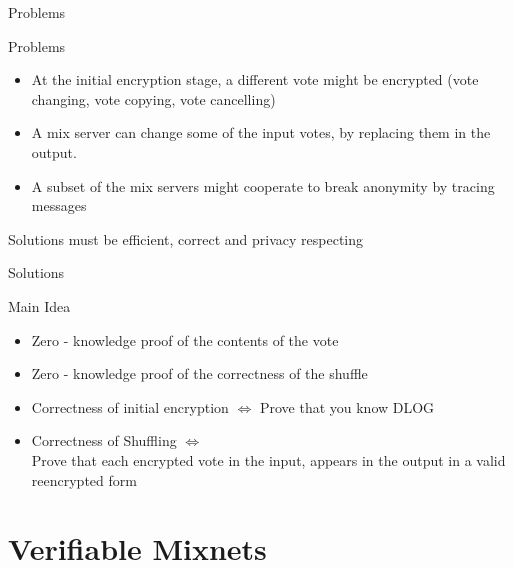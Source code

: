 \documentclass{beamer}
\newcommand*{\addsp}{\usebeamertemplate*{section page1}}
\begin{document}
\begin{frame}{Problems}
\begin{block}{Problems}
\begin{itemize}
\item At the initial encryption stage, a different vote might be encrypted (vote changing, vote copying, vote cancelling)
\item A mix server can change some of the input votes, by replacing them in the output.
\item A subset of the mix servers might cooperate to break anonymity by tracing messages
\end{itemize}
\end{block}

\begin{center}
\begin{large}
Solutions must be efficient, correct and privacy respecting
\end{large}
\end{center}

\end{frame} 

\begin{frame}{Solutions}
\begin{block}{Main Idea}
\begin{itemize}
\item Zero - knowledge proof of the contents of the vote
\item Zero - knowledge proof of the correctness of the shuffle
\end{itemize}
\end{block}

\begin{itemize}
\item Correctness of initial encryption $ \Leftrightarrow $ Prove that you know DLOG
\item Correctness of Shuffling   $ \Leftrightarrow $ \\
 	 Prove that each encrypted vote in the input, appears in the output  in a valid reencrypted form
\end{itemize}
\end{frame}

\section{Verifiable Mixnets}
\begin{frame}
\addsp
\end{frame}
\end{document}
